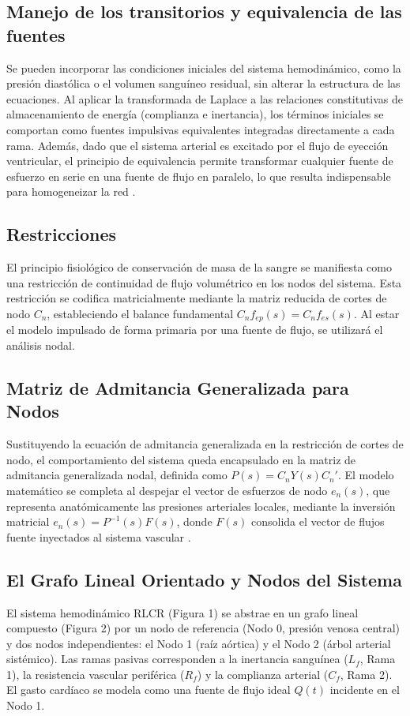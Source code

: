 \documentclass[journal,10pt]{IEEEtran}
\begin{document}
\subsection{Manejo de los transitorios y equivalencia de las fuentes}
Se pueden incorporar las condiciones iniciales del sistema hemodinámico, como la presión diastólica o el volumen sanguíneo residual,
sin alterar la estructura de las ecuaciones. Al aplicar la transformada de Laplace a las relaciones constitutivas de almacenamiento de
energía (complianza e inertancia), los términos iniciales se comportan como fuentes impulsivas equivalentes integradas directamente a 
cada rama. Además, dado que el sistema arterial es excitado por el flujo de eyección ventricular, el principio de equivalencia permite 
transformar cualquier fuente de esfuerzo en serie en una fuente de flujo en paralelo, lo que resulta indispensable para homogeneizar la red \cite{wellstead1979}.
\subsection{Restricciones}
El principio fisiológico de conservación de masa de la sangre se manifiesta como una restricción de continuidad de flujo volumétrico en los 
nodos del sistema. Esta restricción se codifica matricialmente mediante la matriz reducida de cortes de nodo $C_n$, estableciendo el 
balance fundamental $C_n f_{ep}(s) = C_n f_{es}(s)$. Al estar el modelo impulsado de forma primaria por una fuente de flujo, se utilizará el análisis nodal.
\subsection{Matriz de Admitancia Generalizada para Nodos}
Sustituyendo la ecuación de admitancia generalizada en la restricción de cortes de nodo, el comportamiento del sistema queda encapsulado 
en la matriz de admitancia generalizada nodal, definida como $P(s) = C_n Y(s) C_n'$. El modelo matemático se completa al despejar 
el vector de esfuerzos de nodo $e_n(s)$, que representa anatómicamente las presiones arteriales locales, mediante la inversión 
matricial $e_n(s) = P^{-1}(s)F(s)$, donde $F(s)$ consolida el vector de flujos fuente inyectados al sistema vascular \cite{wellstead1979}. 
\subsection{El Grafo Lineal Orientado y Nodos del Sistema}
El sistema hemodinámico RLCR (Figura 1) se abstrae en un grafo lineal compuesto (Figura 2) por un nodo de referencia (Nodo 0, presión venosa central) y 
dos nodos independientes: el Nodo 1 (raíz aórtica) y el Nodo 2 (árbol arterial sistémico). Las ramas pasivas corresponden a la 
inertancia sanguínea ($L_f$, Rama 1), la resistencia vascular periférica ($R_f$) y la complianza arterial ($C_f$, Rama 2).
El gasto cardíaco se modela como una fuente de flujo ideal $Q(t)$ incidente en el Nodo 1.
\end{document}
